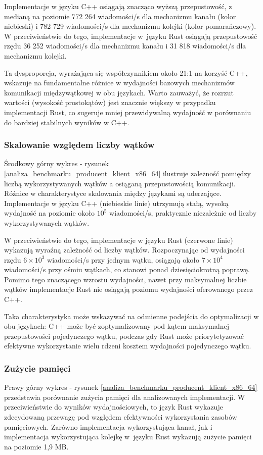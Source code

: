 Implementacje w języku C++ osiągają znacząco wyższą przepustowość, z medianą na poziomie 772 264 wiadomości/s dla mechanizmu kanału (kolor niebieski) i 782 729 wiadomości/s dla mechanizmu kolejki (kolor pomarańczowy). W przeciwieństwie do tego, implementacje w~języku Rust osiągają przepustowość rzędu 36 252 wiadomości/s dla mechanizmu kanału i 31 818 wiadomości/s dla mechanizmu kolejki.

Ta dysproporcja, wyrażająca się współczynnikiem około 21:1 na korzyść C++, wskazuje na fundamentalne różnice w wydajności bazowych mechanizmów komunikacji międzywątkowej w obu językach. Warto zauważyć, że rozrzut wartości (wysokość prostokątów) jest znacznie większy w przypadku implementacji Rust, co sugeruje mniej przewidywalną wydajność w porównaniu do bardziej stabilnych wyników w C++.

\subsubsection{Skalowanie względem liczby wątków}
Środkowy górny wykres - rysunek \ref{analiza_benchmarku_producent_klient_x86_64} ilustruje zależność pomiędzy liczbą wykorzystywanych wątków a osiąganą przepustowością komunikacji. Różnice w charakterystyce skalowania między językami są uderzające. Implementacje w języku C++ (niebieskie linie) utrzymują stałą, wysoką wydajność na poziomie około $10^5$ wiadomości/s, praktycznie niezależnie od liczby wykorzystywanych wątków.

W przeciwieństwie do tego, implementacje w języku Rust (czerwone linie) wykazują wyraźną zależność od liczby wątków. Rozpoczynając od wydajności rzędu $6\times10^3$ wiadomości/s przy jednym wątku, osiągają około $7\times10^4$ wiadomości/s przy ośmiu wątkach, co stanowi ponad dziesięciokrotną poprawę. Pomimo tego znaczącego wzrostu wydajności, nawet przy maksymalnej liczbie wątków implementacje Rust nie osiągają poziomu wydajności oferowanego przez C++.

Taka charakterystyka może wskazywać na odmienne podejścia do optymalizacji w obu językach: C++ może być zoptymalizowany pod kątem maksymalnej przepustowości pojedynczego wątku, podczas gdy Rust może priorytetyzować efektywne wykorzystanie wielu rdzeni kosztem wydajności pojedynczego wątku.


\subsubsection{Zużycie pamięci}
Prawy górny wykres - rysunek \ref{analiza_benchmarku_producent_klient_x86_64} przedstawia porównanie zużycia pamięci dla analizowanych implementacji. W przeciwieństwie do wyników wydajnościowych, to język Rust wykazuje zdecydowaną przewagę pod względem efektywności wykorzystania zasobów pamięciowych. Zarówno implementacja wykorzystująca kanał, jak i implementacja wykorzystująca kolejkę w~języku Rust wykazują zużycie pamięci na poziomie 1,9 MB.

